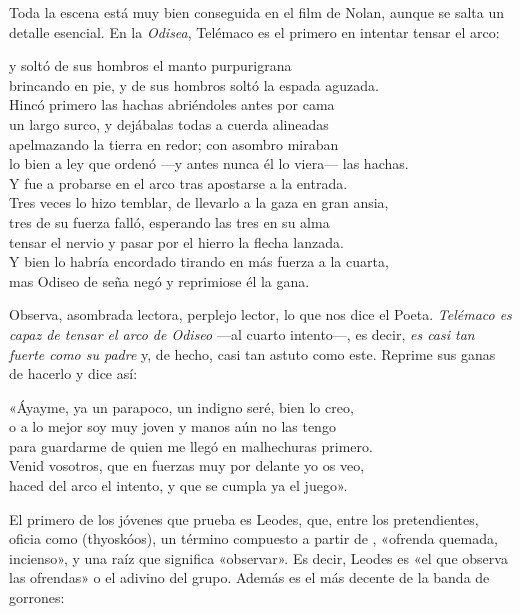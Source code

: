 Toda la escena está muy bien conseguida en el film de Nolan, aunque se salta un detalle esencial. En la \emph{Odisea}, Telémaco es el primero en intentar tensar el arco:

\begin{versocita}
[...] y soltó de sus hombros el manto purpurigrana\\
brincando en pie, y de sus hombros soltó la espada aguzada.\\
Hincó primero las hachas abriéndoles antes por cama\\
un largo surco, y dejábalas todas a cuerda alineadas\\
apelmazando la tierra en redor; con asombro miraban\\
lo bien a ley que ordenó ---y antes nunca él lo viera--- las hachas.\\
Y fue a probarse en el arco tras apostarse a la entrada.\\
Tres veces lo hizo temblar, de llevarlo a la gaza en gran ansia,\\
tres de su fuerza falló, esperando las tres en su alma\\
tensar el nervio y pasar por el hierro la flecha lanzada.\\
Y bien lo habría encordado tirando en más fuerza a la cuarta,\\
mas Odiseo de seña negó y reprimiose él la gana.
\end{versocita}

Observa, asombrada lectora, perplejo lector, lo que nos dice el Poeta. \emph{Telémaco es capaz de tensar el arco de Odiseo} ---al cuarto intento---, es decir, \emph{es casi tan fuerte como su padre} y, de hecho, casi tan astuto como este. Reprime sus ganas de hacerlo y dice así:

\begin{versocita}
«Áyayme, ya un parapoco, un indigno seré, bien lo creo,\\
o a lo mejor soy muy joven y manos aún no las tengo\\
para guardarme de quien me llegó en malhechuras primero.\\
Venid vosotros, que en fuerzas muy por delante yo os veo,\\
haced del arco el intento, y que se cumpla ya el juego».
\end{versocita}

El primero de los jóvenes que prueba es Leodes, que, entre los pretendientes, oficia como  (thyoskóos), un término compuesto a partir de , «ofrenda quemada, incienso», y una raíz que significa «observar». Es decir, Leodes es «el que observa las ofrendas» o el adivino del grupo. Además es el más decente de la banda de gorrones:


